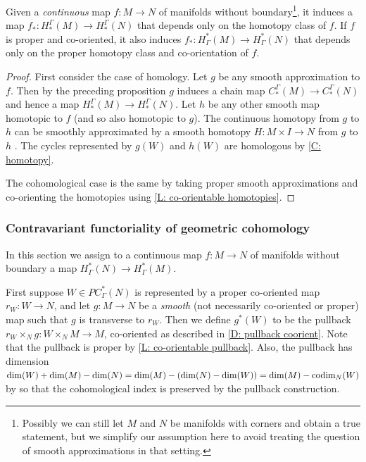 \begin{proposition}\label{P: homology homotopy functor}
Given a \textit{continuous} map $f \colon M \to N$ of manifolds without boundary\footnote{Possibly we can still let $M$ and $N$ be manifolds with corners and obtain a true statement, but we simplify our assumption here to avoid treating the question of smooth approximations in that setting.}, it induces a map $f_*:H_*^\Gamma(M) \to H_*^\Gamma(N)$ that depends only on the homotopy class of $f$. If $f$ is proper and co-oriented, it also induces $f_*:H^*_\Gamma(M) \to H^*_\Gamma(N)$ that depends only on the proper homotopy class and co-orientation of $f$.
\end{proposition}
\begin{proof}
First consider the case of homology. Let $g$ be any smooth approximation to $f$. Then by the preceding proposition $g$ induces a chain map $C_*^\Gamma(M) \to C_*^\Gamma(N)$ and hence a map $H_*^\Gamma(M) \to H_*^\Gamma(N)$. Let $h$ be any other smooth map homotopic to $f$ (and so also homotopic to $g$). The continuous homotopy from $g$ to $h$ can be smoothly approximated by a smooth homotopy $H \colon M \times I \to N$ from $g$ to $h$ \cite[Theorem III.2.5]{Kos93}. The cycles represented by $g(W)$ and $h(W)$ are homologous by \cref{C: homotopy}.

The cohomological case is the same by taking proper smooth approximations and co-orienting the homotopies using \cref{L: co-orientable homotopies}.
\end{proof}




\subsubsection{Contravariant functoriality of geometric cohomology}\label{S: cohomology pullback}

In this section we assign to a continuous map $f \colon M \to N$ of manifolds without boundary a map $H^*_\Gamma(N) \to H^*_\Gamma(M)$.

First suppose $W \in PC^*_\Gamma(N)$ is represented by a proper co-oriented map $r_W \colon W \to N$, and let
$g \colon M \to N$ be a \textit{smooth} (not necessarily co-oriented or proper) map such that $g$ is transverse to $r_W$. Then we define $g^*(W)$ to be the pullback $r_W\times_N g \colon W\times_N M \to M$, co-oriented as described in \cref{D: pullback coorient}. Note that the pullback is proper by \cref{L: co-orientable pullback}. Also, the pullback has dimension $\dim(W)+\dim(M)-\dim(N) = \dim(M)-(\dim(N)-\dim(W)) = \dim(M)-\text{codim}_N(W)$ by \cite[Theorem 6.4]{Joy12} so that the cohomological index is preserved by the pullback construction.


